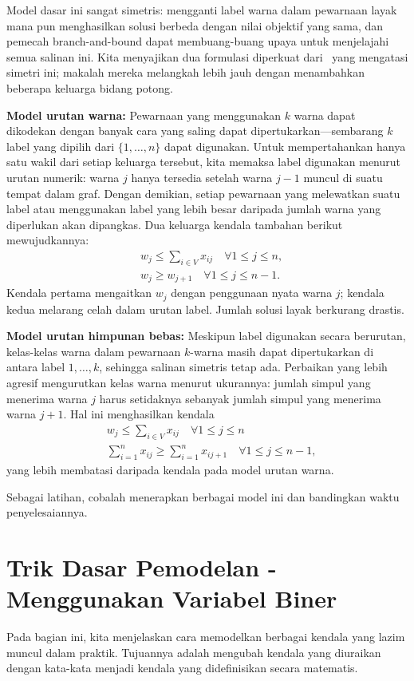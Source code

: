 Model dasar ini sangat simetris: mengganti label warna dalam pewarnaan layak mana pun menghasilkan solusi berbeda dengan nilai objektif yang sama, dan pemecah branch-and-bound dapat membuang-buang upaya untuk menjelajahi semua salinan ini. Kita menyajikan dua formulasi diperkuat dari~\cite{MENDEZDIAZ2008159} yang mengatasi simetri ini; makalah mereka melangkah lebih jauh dengan menambahkan beberapa keluarga bidang potong.

\textbf{ Model urutan warna:}
Pewarnaan yang menggunakan $k$ warna dapat dikodekan dengan banyak cara yang saling dapat dipertukarkan---sembarang $k$ label yang dipilih dari $\{1, \ldots, n\}$ dapat digunakan. Untuk mempertahankan hanya satu wakil dari setiap keluarga tersebut, kita memaksa label digunakan menurut urutan numerik: warna $j$ hanya tersedia setelah warna $j-1$ muncul di suatu tempat dalam graf. Dengan demikian, setiap pewarnaan yang melewatkan suatu label atau menggunakan label yang lebih besar daripada jumlah warna yang diperlukan akan dipangkas. Dua keluarga kendala tambahan berikut mewujudkannya:
$$
\begin{aligned}
& w_j \leq \sum_{i \in V} x_{i j} \quad \forall 1 \leq j \leq n, \\
& w_j \geq w_{j+1} \quad \forall 1 \leq j \leq n-1 .
\end{aligned}
$$
Kendala pertama mengaitkan $w_j$ dengan penggunaan nyata warna $j$; kendala kedua melarang celah dalam urutan label. Jumlah solusi layak berkurang drastis.

\textbf{ Model urutan himpunan bebas:}
Meskipun label digunakan secara berurutan, kelas-kelas warna dalam pewarnaan $k$-warna masih dapat dipertukarkan di antara label $1, \ldots, k$, sehingga salinan simetris tetap ada. Perbaikan yang lebih agresif mengurutkan kelas warna menurut ukurannya: jumlah simpul yang menerima warna $j$ harus setidaknya sebanyak jumlah simpul yang menerima warna $j+1$. Hal ini menghasilkan kendala
$$
\begin{aligned}
& w_j \leq \sum_{i \in V} x_{i j} \quad \forall 1 \leq j \leq n \\
& \sum_{i=1}^n x_{i j} \geq \sum_{i=1}^n x_{i j+1} \quad \forall 1 \leq j \leq n-1 ,
\end{aligned}
$$
yang lebih membatasi daripada kendala pada model urutan warna.

Sebagai latihan, cobalah menerapkan berbagai model ini dan bandingkan waktu penyelesaiannya.

\newpage
\section{Trik Dasar Pemodelan - Menggunakan Variabel Biner}
\label{sec:modeling-tricks}
Pada bagian ini, kita menjelaskan cara memodelkan berbagai kendala yang lazim muncul dalam praktik. Tujuannya adalah mengubah kendala yang diuraikan dengan kata-kata menjadi kendala yang didefinisikan secara matematis.

